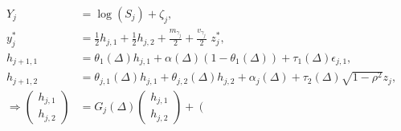 \begin{align}
	Y_j &= \log(S_j) + \zeta_j, \nonumber   \\
  y_j^* &= \frac{1}{2}h_{j,1} + \frac{1}{2} h_{j,2} + \frac{m_{\gamma_j}}{2} + \frac{v_{\gamma_j}}{2} \,\, z^*_{j},   \label{eq:decomposed} \\
  h_{j+1,1} &= \theta_{1}(\Delta) h_{j,1} + \alpha(\Delta)(1-\theta_1(\Delta)) + \tau_1(\Delta)  \epsilon_{j,1}, \nonumber \\
  h_{j+1,2} &= \theta_{j,1}(\Delta) h_{j,1} + \theta_{j,2}(\Delta) h_{j,2} + \alpha_j(\Delta) + \tau_2(\Delta) \sqrt{1 - \rho^2} z_j, \nonumber \\
  \Rightarrow \left( \begin{array}{cc}
                       h_{j,1} \\
                       h_{j,2}
                     \end{array} \right) &= G_j(\Delta) \left( \begin{array}{cc}
                                                                 h_{j,1} \\ h_{j,2}
                                                               \end{array} \right) + \left( \begin{array}{cc}

\end{array}
\end{align}
